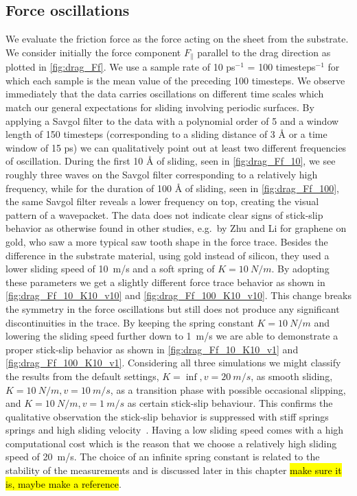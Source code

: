 \subsection{Force oscillations}\label{sec:force_oscillations}
We evaluate the friction force as the force acting on the sheet from the
substrate. We consider initially the force component $F_{\parallel}$ parallel
to the drag direction as plotted in \cref{fig:drag_Ff}. We use a sample rate of
10 ps$^{-1}$ = 100 timesteps$^{-1}$ for which each sample is the mean value of
the preceding 100 timesteps. We observe immediately that the data carries oscillations on different time scales which match our general expectations for
sliding involving periodic surfaces. By applying a Savgol filter to the data
with a polynomial order of 5 and a window length of 150 timesteps (corresponding to a
sliding distance of 3 Å or a time window of 15 ps) we can qualitatively point
out at least two different frequencies of oscillation. During the first 10 Å of
sliding, seen in \cref{fig:drag_Ff_10}, we see roughly three waves on the Savgol
filter corresponding to a relatively high frequency, while for the duration of
100 Å of sliding, seen in \cref{fig:drag_Ff_100}, the same Savgol filter reveals
a lower frequency on top, creating the visual pattern of a wavepacket. The data
does not indicate clear signs of stick-slip behavior as otherwise found in
other studies, e.g.\ by Zhu and Li \cite{zhu_study_2018} for graphene on gold,
who saw a more typical saw tooth shape in the force trace. Besides the difference
in the substrate material, using gold instead of silicon, they used a lower sliding
speed of \SI{10}{m/s} and a soft spring of $K = \SI{10}{N/m}$. By adopting these
parameters we get a slightly different force trace behavior as shown in
\cref{fig:drag_Ff_10_K10_v10} and \cref{fig:drag_Ff_100_K10_v10}. This change
breaks the symmetry in the force oscillations but still does not produce any
significant discontinuities in the trace. By keeping the spring constant $K =
\SI{10}{N/m}$ and lowering the sliding speed further down to \SI{1}{m/s} we are
able to demonstrate a proper stick-slip behavior as shown in
\cref{fig:drag_Ff_10_K10_v1} and \cref{fig:drag_Ff_100_K10_v1}. Considering all
three simulations we might classify the results from the default settings, $K =
\inf, v = \SI{20}{m/s}$, as smooth sliding,  $K = \SI{10}{N/m}, v =
\SI{10}{m/s}$, as a transition phase with possible occasional slipping, and $K
= \SI{10}{N/m}, v = \SI{1}{m/s}$ as certain stick-slip behaviour. This confirms the qualitative observation the stick-slip behavior is suppressed with stiff springs~\cite{bonelli_atomistic_2009} springs and high sliding velocity~\cite{liu_high-speed_2014}. Having a low sliding speed comes with a high computational cost which is the reason that we choose a relatively high sliding speed of \SI{20}{m/s}. The choice of an infinite spring constant is related to the stability of the measurements and is discussed later in this chapter \hl{make sure it is, maybe make a reference}.


